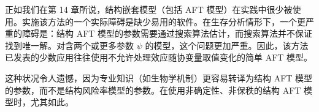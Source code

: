 正如我们在第 14 章所说，结构嵌套模型（包括 AFT 模型）在实践中很少被使用。实施该方法的一个实际障碍是缺少易用的软件。在生存分析情形下，一个更严重的障碍是：结构 AFT 模型的参数需要通过搜索算法估计，而搜索算法并不保证找到唯一解。对含两个或更多参数 $\psi$ 的模型，这个问题更加严重。因此，该方法已发表的少数应用往往使用不允许处理效应随协变量取值变化的简单 AFT 模型。

这种状况令人遗憾，因为专业知识（如生物学机制）更容易转译为结构 AFT 模型的参数，而不是结构风险率模型的参数。在使用非确定性、非保秩的结构 AFT 模型时，尤其如此。
